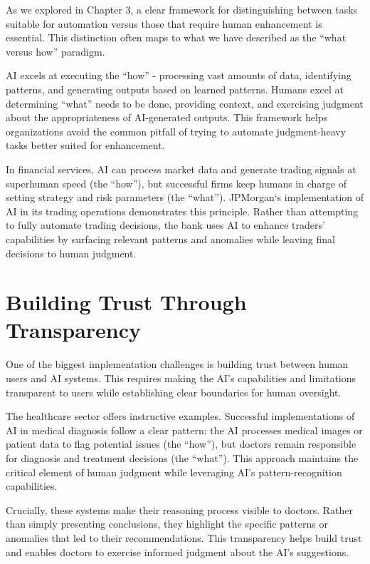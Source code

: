 \documentclass[
  Letterpaper,
]{scrbook}
\begin{document}
As we explored in Chapter 3, a clear framework for distinguishing
between tasks suitable for automation versus those that require human
enhancement is essential. This distinction often maps to what we have
described as the ``what versus how'' paradigm.

AI excels at executing the ``how'' - processing vast amounts of data,
identifying patterns, and generating outputs based on learned patterns.
Humans excel at determining ``what'' needs to be done, providing
context, and exercising judgment about the appropriateness of
AI-generated outputs. This framework helps organizations avoid the
common pitfall of trying to automate judgment-heavy tasks better suited
for enhancement.

In financial services, AI can process market
data and generate trading signals at superhuman speed (the ``how''), but
successful firms keep humans in charge of setting strategy and risk
parameters (the ``what'').
JPMorgan`s implementation of AI in its
trading operations demonstrates this principle. Rather than attempting
to fully automate trading decisions, the bank uses AI to enhance
traders' capabilities by surfacing relevant patterns and anomalies while
leaving final decisions to human judgment.

\section{\texorpdfstring{Building Trust Through
Transparency}{Building Trust Through Transparency}}\label{building-trust-through-transparency}

One of the biggest implementation challenges is building trust between
human users and AI systems. This requires making the AI's capabilities
and limitations transparent to users while establishing clear boundaries
for human oversight.

The healthcare sector offers instructive examples.
Successful implementations of AI in medical
diagnosis follow a clear pattern: the AI
processes medical images or patient data to flag potential issues (the
``how''), but doctors remain responsible for diagnosis and treatment
decisions (the ``what''). This approach maintains the critical element
of human judgment while leveraging AI's pattern-recognition
capabilities.

Crucially, these systems make their reasoning process visible to
doctors. Rather than simply presenting conclusions, they highlight the
specific patterns or anomalies that led to their recommendations. This
transparency helps build trust and enables doctors to exercise informed
judgment about the AI's suggestions.
\end{document}
